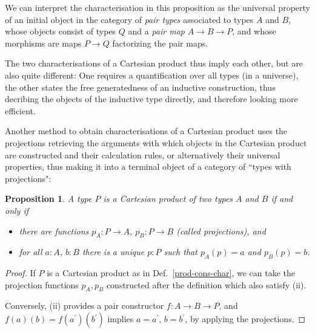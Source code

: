 \documentclass{amsart}
\theoremstyle{plain}
\numberwithin{equation}{section} %
\numberwithin{figure}{section} %
\theoremstyle{plain}
\theoremstyle{plain}
\theoremstyle{plain}
\theoremstyle{plain}
\theoremstyle{plain}
\newtheorem{prop}[thm]{Proposition} %
\theoremstyle{plain}
\theoremstyle{remark}
\theoremstyle{remark}
\theoremstyle{remark}
\begin{document}
We can interpret the characterisation in this proposition as the universal property of an initial object in the category of \textit{pair types} associated to types $A$ and $B$, whose objects consist of types $Q$ and a \textit{pair map} $A \rightarrow B \rightarrow P$, and whose morphisms are maps $P \rightarrow Q$ factorizing the pair maps.

The two characterisations of a Cartesian product thus imply each other, but are also quite different: One requires a quantification over all types (in a universe), the other states the free generatedness of an inductive construction, thus decribing the objects of the inductive type directly, and therefore looking more efficient. 

Another method to obtain characterisations of a Cartesian product uses the projections retrieving the arguments with which objects in the Cartesian product are constructed and their calculation rules, or alternatively their universal properties, thus making it into a terminal object of a category of ``types with projections":

\begin{prop} \label{prod-proj-calc-char} %
A type $P$ is a Cartesian product of two types $A$ and $B$ if and only if
\begin{itemize}
\item[(i)] there are functions $p_A : P \rightarrow A$, $p_B : P \rightarrow B$ (called \textit{projections}), and
\item[(ii)] for all $a : A$, $b : B$ there is a unique $p : P$ such that $p_A(p) = a$ and $p_B(p) = b$. 
\end{itemize}
\end{prop}
\begin{proof}
If $P$ is a Cartesian product as in Def.~\ref{prod-cons-char}, we can take the projection functions $p_A, p_B$ constructed after the definition which also satisfy (ii).

Conversely, (ii) provides a pair constructor $f : A \rightarrow B \rightarrow P$, and $f(a)(b) = f(a^\prime)(b^\prime)$ implies $a = a^\prime$, $b = b^\prime$, by applying the projections.
\end{proof}
\end{document}
